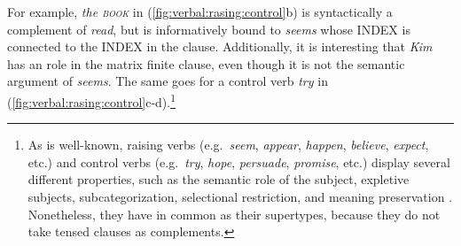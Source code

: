 

\noindent For example, \textit{the \textsc{book}} in
(\ref{fig:verbal:rasing:control}b) is syntactically a complement of
\textit{read}, but is informatively bound to \textit{seems} whose
INDEX is connected to the INDEX in the clause.  Additionally, it is
interesting that \textit{Kim} has an  role in the matrix
finite clause, even though it is not the
semantic argument of \textit{seems}. The same goes for a control verb
\textit{try} in (\ref{fig:verbal:rasing:control}c-d).\footnote{As is
  well-known, raising verbs (e.g.\ \textit{seem}, \textit{appear},
  \textit{happen}, \textit{believe}, \textit{expect}, etc.) and
  control verbs (e.g.\ \textit{try}, \textit{hope}, \textit{persuade},
  \textit{promise}, etc.) display several different properties, such
  as the semantic role of the subject, expletive subjects,
  subcategorization, selectional restriction, and meaning preservation
  \citep{kim:sells:08}. Nonetheless, they have
   in common as their supertypes, because
  they do not take tensed clauses as complements.}




